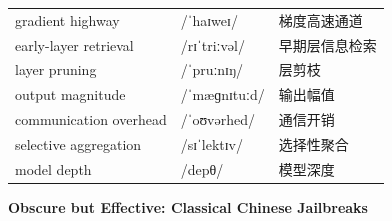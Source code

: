 \documentclass[UTF8,12pt,a4paper]{ctexart}
\providecommand{\zh}[1]{#1}
\begin{document}
\begin{tabular*}{\textwidth}{@{\extracolsep{\fill}}lll@{}}
gradient highway & {\ipafont /ˈhaɪweɪ/} & \zh{梯度高速通道} \\
early-layer retrieval & {\ipafont /rɪˈtriːvəl/} & \zh{早期层信息检索} \\
layer pruning & {\ipafont /ˈpruːnɪŋ/} & \zh{层剪枝} \\
output magnitude & {\ipafont /ˈmæɡnɪtuːd/} & \zh{输出幅值} \\
communication overhead & {\ipafont /ˈoʊvərhed/} & \zh{通信开销} \\
selective aggregation & {\ipafont /sɪˈlektɪv/} & \zh{选择性聚合} \\
model depth & {\ipafont /depθ/} & \zh{模型深度} \\
\bottomrule
\end{tabular*}

\newpage

\begin{center}
    {\Large\bfseries Obscure but Effective: Classical Chinese Jailbreaks}
\end{center}
\end{document}
